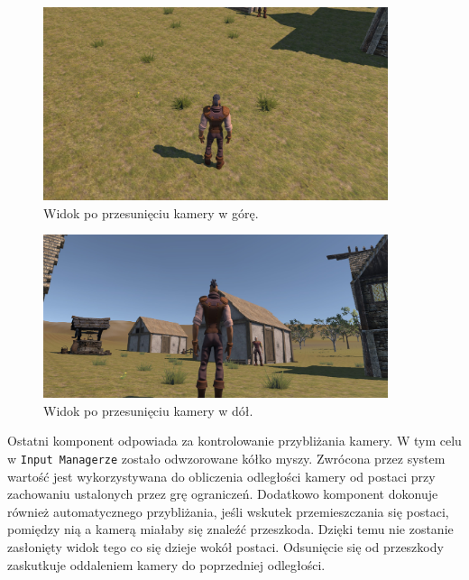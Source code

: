 \begin{figure}[h!]
    \centering
    \includegraphics[width=0.9\textwidth]{images/implementacja/poruszanie_postacią/widok_z_gory.jpg}
    \caption{Widok po przesunięciu kamery w górę.}\label{fig:gora}
\end{figure}

\begin{figure}[h!]
    \centering
    \includegraphics[width=0.9\textwidth]{images/implementacja/poruszanie_postacią/widok_z_dolu.jpg}
    \caption{Widok po przesunięciu kamery w dół.}\label{fig:dol}
\end{figure}

Ostatni komponent odpowiada za kontrolowanie przybliżania kamery. W tym celu w \texttt{Input Managerze} zostało odwzorowane kółko
myszy. Zwrócona przez system wartość jest wykorzystywana do obliczenia odległości kamery od postaci przy zachowaniu
ustalonych przez grę ograniczeń. Dodatkowo komponent dokonuje również automatycznego przybliżania, jeśli wskutek
przemieszczania się postaci, pomiędzy nią a kamerą miałaby się znaleźć przeszkoda. Dzięki temu nie zostanie zasłonięty
widok tego co się dzieje wokół postaci. Odsunięcie się od przeszkody zaskutkuje oddaleniem kamery do poprzedniej
odległości.
